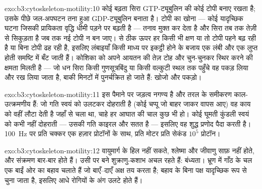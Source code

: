 \begin{solution}{exo:b3:cytoskeleton-motility:10}
कोई बढ़ता सिरा GTP-ट्यूबुलिन की कोई टोपी बनाए रखता है; उसके पीछे
जल-अपघटन तना हुआ GDP-ट्यूबुलिन बनाता है। टोपी का खोना --- कोई यादृच्छिक
घटना जिसकी प्रायिकता वृद्धि धीमी पड़ने पर बढ़ती है --- तनाव मुक्त कर
देता है और सिरा तब तक तेज़ी से सिकुड़ता है जब तक नई टोपी न बन जाए।
 से ठीक ऊपर हर  किसी भी क्षण या तो टोपी
पहने बढ़ रही है या बिना टोपी ढह रही है, इसलिए लंबाइयाँ किसी माध्य पर
इकट्ठी होने के बजाय एक लंबी और एक लुप्त होती समष्टि में बँट जाती हैं।
कोशिका को अपने आयतन की तेज़ टोह और चुन-चुनकर स्थिर करने की क्षमता
मिलती है --- जो धन सिरा किसी गुणसूत्रबिंदु या किसी वल्कुटी स्थल तक
पहुँचे वह पकड़ लिया और रख लिया जाता है, बाकी मिनटों में पुनर्चक्रित हो
जाते हैं: खोजो और पकड़ो।
\end{solution}

\begin{solution}{exo:b3:cytoskeleton-motility:11}
इस पैमाने पर जड़त्व नगण्य है और तरल के समीकरण काल-उत्क्रमणीय हैं: जो
गति स्वयं को उलटकर दोहराती है (कोई चप्पू जो बाहर जाकर वापस आए) वह काय
को वहीं लौटा देती है जहाँ से चला था, चाहे हर आघात की चाल कुछ भी हो।
कोई घूमती कुंडली स्वयं को कभी नहीं दोहराती --- उसकी गति काइरल और सतत
है --- इसलिए वह शुद्ध प्रणोद पैदा करती है। \qty{100}{Hz} पर
प्रति चक्कर एक हज़ार प्रोटॉनों के साथ, प्रति मोटर प्रति सेकंड $10^{5}$
प्रोटॉन।
\end{solution}

\begin{solution}{exo:b3:cytoskeleton-motility:12}
वायुमार्ग के  हिल नहीं सकते, श्लेष्मा और जीवाणु साफ़ नहीं होते,
और संक्रमण बार-बार होते हैं। उसी  पर बने शुक्राणु-कशाभ अचल
रहते हैं: बंध्यता। भ्रूण में गाँठ के चल  एक बाईं ओर का बहाव
चलाते हैं जो बाएँ--दाएँ अक्ष तय करता है; बहाव के बिना पक्ष यादृच्छिक रूप
से चुना जाता है, इसलिए आधे रोगियों के अंग उलटे होते हैं।
\end{solution}

